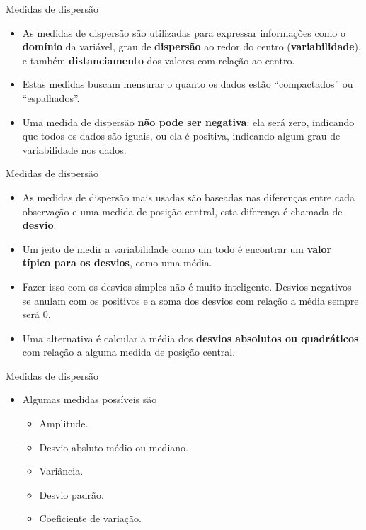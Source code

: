 \documentclass[
  ignorenonframetext,
  serif,
  professionalfont,
  usenames,
  dvipsnames,
  aspectratio = 169]{beamer}
\providecommand{\tightlist}{%
  \setlength{\itemsep}{0pt}\setlength{\parskip}{0pt}}
\renewcommand{\tightlist}{%
  \setlength{\itemsep}{0\baselineskip}
  \setlength{\parskip}{0.25\baselineskip}
}
\begin{document}
\begin{frame}{Medidas de dispersão}
\label{medidas-de-dispersuxe3o-3}
\begin{itemize}
\item
  As medidas de dispersão são utilizadas para expressar informações como
  o \textbf{domínio} da variável, grau de \textbf{dispersão} ao redor do
  centro (\textbf{variabilidade}), e também \textbf{distanciamento} dos
  valores com relação ao centro.
\item
  Estas medidas buscam mensurar o quanto os dados estão ``compactados''
  ou ``espalhados''.
\item
  Uma medida de dispersão \textbf{não pode ser negativa}: ela será zero,
  indicando que todos os dados são iguais, ou ela é positiva, indicando
  algum grau de variabilidade nos dados.
\end{itemize}
\end{frame}

\begin{frame}{Medidas de dispersão}
\label{medidas-de-dispersuxe3o-4}
\begin{itemize}
\item
  As medidas de dispersão mais usadas são baseadas nas diferenças entre
  cada observação e uma medida de posição central, esta diferença é
  chamada de \textbf{desvio}.
\item
  Um jeito de medir a variabilidade como um todo é encontrar um
  \textbf{valor típico para os desvios}, como uma média.
\item
  Fazer isso com os desvios simples não é muito inteligente. Desvios
  negativos se anulam com os positivos e a soma dos desvios com relação
  a média sempre será 0.
\item
  Uma alternativa é calcular a média dos
  \textbf{desvios absolutos ou quadráticos} com relação a alguma medida
  de posição central.
\end{itemize}
\end{frame}

\begin{frame}{Medidas de dispersão}
\label{medidas-de-dispersuxe3o-5}
\begin{itemize}
\tightlist
\item
  Algumas medidas possíveis são

  \begin{itemize}
  \tightlist
  \item
    Amplitude.
  \item
    Desvio absluto médio ou mediano.
  \item
    Variância.
  \item
    Desvio padrão.
  \item
    Coeficiente de variação.
  \end{itemize}
\end{itemize}
\end{frame}
\end{document}
